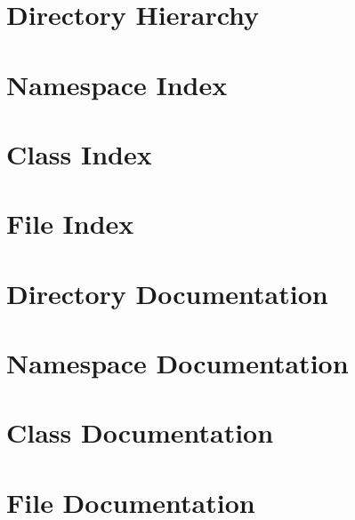 \chapter{Directory Hierarchy}

\chapter{Namespace Index}

\chapter{Class Index}

\chapter{File Index}

\chapter{Directory Documentation}


\chapter{Namespace Documentation}

\chapter{Class Documentation}




\chapter{File Documentation}




  \backmatter
  \newpage
  \clearemptydoublepage
  \printindex

